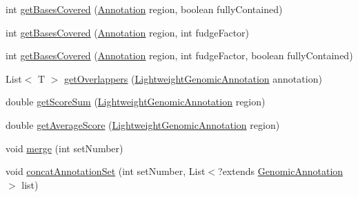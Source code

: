 \begin{DoxyCompactItemize}
\item 
int \hyperlink{classbroad_1_1core_1_1annotation_1_1_annotation_reader_3_01_t_01extends_01_genomic_annotation_01_4_ab566f68d145ef8a6abf885fecd89bb2f}{get\+Bases\+Covered} (\hyperlink{interfaceumms_1_1core_1_1annotation_1_1_annotation}{Annotation} region, boolean fully\+Contained)
\item 
int \hyperlink{classbroad_1_1core_1_1annotation_1_1_annotation_reader_3_01_t_01extends_01_genomic_annotation_01_4_a6233292730ab40e9961587b9041e6ab6}{get\+Bases\+Covered} (\hyperlink{interfaceumms_1_1core_1_1annotation_1_1_annotation}{Annotation} region, int fudge\+Factor)
\item 
int \hyperlink{classbroad_1_1core_1_1annotation_1_1_annotation_reader_3_01_t_01extends_01_genomic_annotation_01_4_af30b2f11ec171223b8c63df0d18ff4ed}{get\+Bases\+Covered} (\hyperlink{interfaceumms_1_1core_1_1annotation_1_1_annotation}{Annotation} region, int fudge\+Factor, boolean fully\+Contained)
\item 
List$<$ T $>$ \hyperlink{classbroad_1_1core_1_1annotation_1_1_annotation_reader_3_01_t_01extends_01_genomic_annotation_01_4_adc2c7a42f53ce03a910cbe0366a7233e}{get\+Overlappers} (\hyperlink{interfacebroad_1_1core_1_1annotation_1_1_lightweight_genomic_annotation}{Lightweight\+Genomic\+Annotation} annotation)
\item 
double \hyperlink{classbroad_1_1core_1_1annotation_1_1_annotation_reader_3_01_t_01extends_01_genomic_annotation_01_4_a268ade3e42daed82b3f2db46ee3fd896}{get\+Score\+Sum} (\hyperlink{interfacebroad_1_1core_1_1annotation_1_1_lightweight_genomic_annotation}{Lightweight\+Genomic\+Annotation} region)
\item 
double \hyperlink{classbroad_1_1core_1_1annotation_1_1_annotation_reader_3_01_t_01extends_01_genomic_annotation_01_4_ab47a5d591255960b69742d1ea010a04d}{get\+Average\+Score} (\hyperlink{interfacebroad_1_1core_1_1annotation_1_1_lightweight_genomic_annotation}{Lightweight\+Genomic\+Annotation} region)
\item 
void \hyperlink{classbroad_1_1core_1_1annotation_1_1_annotation_reader_3_01_t_01extends_01_genomic_annotation_01_4_a9d5b0a33ce9becb24ca2e384753b5769}{merge} (int set\+Number)
\item 
void \hyperlink{classbroad_1_1core_1_1annotation_1_1_annotation_reader_3_01_t_01extends_01_genomic_annotation_01_4_adbf3eb7df259742adac2209dfd5699a1}{concat\+Annotation\+Set} (int set\+Number, List$<$?extends \hyperlink{interfacebroad_1_1core_1_1annotation_1_1_genomic_annotation}{Genomic\+Annotation} $>$ list)

\end{DoxyCompactItemize}
